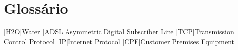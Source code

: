 \chapter{Glossário}

\footnotesize
\SingleSpacing

\begin{multicols}{2}
\begin{acronym}[AAAAAA]

	[H2O]{Water}
	[ADSL]{Asymmetric Digital Subscriber Line}
	[TCP]{Transmission Control Protocol}
	[IP]{Internet Protocol}
	[CPE]{Customer Premises Equipment}

\end{acronym}
\end{multicols}

